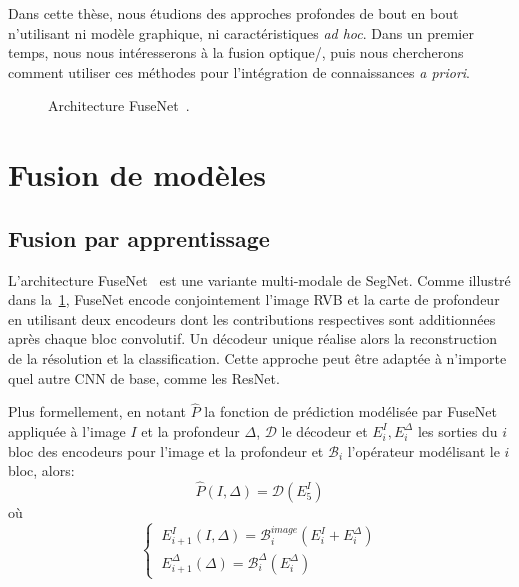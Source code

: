 Dans cette thèse, nous étudions des approches profondes de bout en bout n'utilisant ni modèle graphique, ni caractéristiques \emph{ad hoc}. Dans un premier temps, nous nous intéresserons à la fusion optique/, puis nous chercherons comment utiliser ces méthodes pour l'intégration de connaissances \emph{a priori}.

\begin{figure}[h]
    \resizebox{\textwidth}{!}{}
    \caption[Architecture FuseNet.]{Architecture FuseNet~\cite{hazirbas_fusenet_2016}.}
    \label{fig:fusenet}
\end{figure}

\section{Fusion de modèles}
\label{sec:fusion}

\subsection{Fusion par apprentissage}

L'architecture FuseNet~\cite{hazirbas_fusenet_2016} est une variante multi-modale de SegNet. Comme illustré dans la~\cref{fig:fusenet}, FuseNet encode conjointement l'image \gls{RVB} et la carte de profondeur en utilisant deux encodeurs dont les contributions respectives sont additionnées après chaque bloc convolutif. Un décodeur unique réalise alors la reconstruction de la résolution et la classification. Cette approche peut être adaptée à n'importe quel autre \gls{CNN} de base, comme les ResNet.

Plus formellement, en notant $\hat{P}$ la fonction de prédiction modélisée par FuseNet appliquée à l'image $I$ et la profondeur $\Delta$, $\mathcal{D}$ le décodeur et $E^I_i, E^\Delta_i$ les sorties du $i$\ieme bloc des encodeurs pour l'image et la profondeur et $\mathcal{B}_i$ l'opérateur modélisant le $i$\ieme bloc, alors:
\begin{equation}
\hat{P}(I,\Delta) = \mathcal{D}\left(E_5^I\right)
\end{equation}
où
\begin{equation}
  \begin{cases}
    ~E_{i+1}^I(I,\Delta) = \mathcal{B}_i^\mathit{image}\left(E_i^I + E_i^\Delta\right)\\
    ~E_{i+1}^\Delta(\Delta) = \mathcal{B}_i^\Delta(E_i^\Delta)
  \end{cases}
\end{equation}

